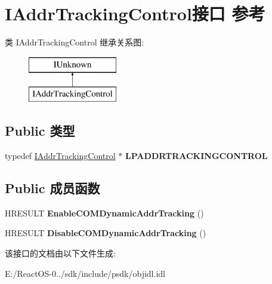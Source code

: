 \hypertarget{interface_i_addr_tracking_control}{}\section{I\+Addr\+Tracking\+Control接口 参考}
\label{interface_i_addr_tracking_control}
类 I\+Addr\+Tracking\+Control 继承关系图\+:\begin{figure}[H]
\begin{center}
\leavevmode
\includegraphics[height=2.000000cm]{interface_i_addr_tracking_control}
\end{center}
\end{figure}
\subsection*{Public 类型}
\begin{DoxyCompactItemize}
\item 
\mbox{\label{interface_i_addr_tracking_control_ad741f4611acfdf8ed44fc78ecfaffea6}} 
typedef \hyperlink{interface_i_addr_tracking_control}{I\+Addr\+Tracking\+Control} $\ast$ {\bfseries L\+P\+A\+D\+D\+R\+T\+R\+A\+C\+K\+I\+N\+G\+C\+O\+N\+T\+R\+OL}
\end{DoxyCompactItemize}
\subsection*{Public 成员函数}
\begin{DoxyCompactItemize}
\item 
\mbox{\label{interface_i_addr_tracking_control_aae4f073c7d83e1115741d6c19641432c}} 
H\+R\+E\+S\+U\+LT {\bfseries Enable\+C\+O\+M\+Dynamic\+Addr\+Tracking} ()
\item 
\mbox{\label{interface_i_addr_tracking_control_a9efe88f438f7911d629e2bb3d476bb40}} 
H\+R\+E\+S\+U\+LT {\bfseries Disable\+C\+O\+M\+Dynamic\+Addr\+Tracking} ()
\end{DoxyCompactItemize}


该接口的文档由以下文件生成\+:\begin{DoxyCompactItemize}
\item 
E\+:/\+React\+O\+S-\/0../sdk/include/psdk/objidl.\+idl\end{DoxyCompactItemize}
